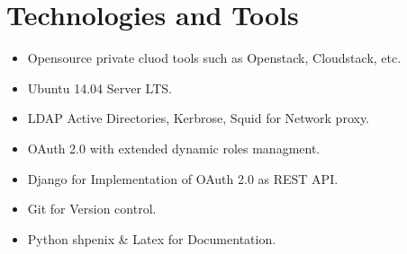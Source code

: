 \documentclass[12pt]{report}
\begin{document}
\section{Technologies and Tools}

	\begin{itemize}
		\item Opensource private cluod tools such as Openstack, Cloudstack, etc.
		\item Ubuntu 14.04 Server LTS.
		\item LDAP Active Directories, Kerbrose, Squid for Network proxy.
		\item OAuth 2.0 with extended dynamic roles managment.
		\item Django for Implementation of OAuth 2.0 as REST API.
		\item Git for Version control. 
		\item Python shpenix \& Latex for Documentation.
	\end{itemize}
	
\end{document}
